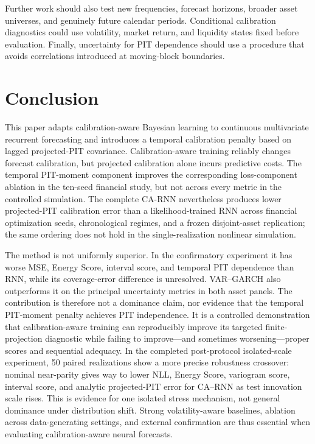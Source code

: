 \documentclass[11pt]{article}
\begin{document}
Further work should also test new frequencies, forecast horizons, broader asset
universes, and genuinely future calendar periods. Conditional calibration
diagnostics could use volatility, market return, and liquidity states fixed
before evaluation. Finally, uncertainty for PIT dependence should use a
procedure that avoids correlations introduced at moving-block boundaries.

\section{Conclusion}

This paper adapts calibration-aware Bayesian learning to continuous multivariate
recurrent forecasting and introduces a temporal calibration penalty based on
lagged projected-PIT covariance. Calibration-aware training reliably changes
forecast calibration, but projected calibration alone incurs predictive costs.
The temporal PIT-moment component improves the corresponding loss-component
ablation in the ten-seed financial study, but not across every metric in the
controlled simulation. The complete CA-RNN nevertheless produces lower
projected-PIT calibration error than a likelihood-trained RNN across financial
optimization seeds, chronological regimes, and a frozen disjoint-asset
replication; the same ordering does not hold in the single-realization nonlinear
simulation.

The method is not uniformly superior. In the confirmatory experiment it has worse
MSE, Energy Score, interval score, and temporal PIT dependence than RNN, while its
coverage-error difference is unresolved. VAR--GARCH also outperforms it on the
principal uncertainty metrics in both asset panels. The contribution is therefore
not a dominance claim, nor evidence that the temporal PIT-moment penalty achieves
PIT independence. It is a controlled demonstration that calibration-aware
training can reproducibly improve its targeted finite-projection diagnostic while
failing to improve---and sometimes worsening---proper scores and sequential
adequacy. In the completed post-protocol isolated-scale experiment, 50 paired
realizations show a more precise robustness crossover: nominal near-parity gives
way to lower NLL, Energy Score, variogram score, interval score, and analytic
projected-PIT error for CA--RNN as test innovation scale rises. This is evidence
for one isolated stress mechanism, not general dominance under distribution
shift. Strong volatility-aware
baselines, ablation across data-generating settings, and external confirmation
are thus essential when evaluating calibration-aware neural forecasts.
\end{document}
